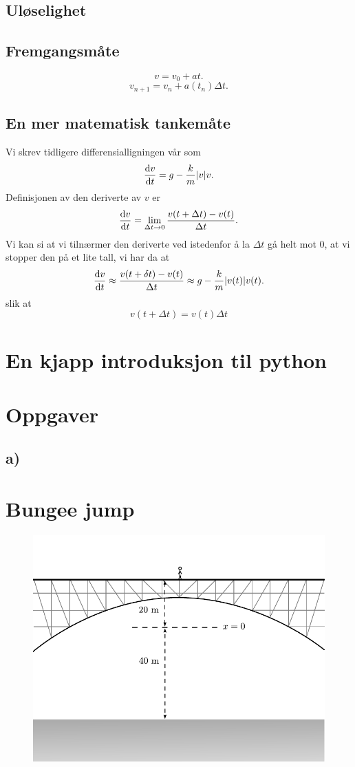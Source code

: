 \documentclass[a4paper, 11pt, notitlepage, english]{article}
\renewcommand{\d}{{\rm d}}
\begin{document}
\subsection{Uløselighet}

\subsection{Fremgangsmåte}
$$v = v_0 + a t.$$
$$v_{n+1} = v_n + a(t_n)\Delta t.$$

\subsection{En mer matematisk tankemåte}
Vi skrev tidligere differensialligningen vår som
$$\frac{\d v}{\d t} = g - \frac{k}{m}|v|v.$$
Definisjonen av den deriverte av $v$ er
$$\frac{\d v}{\d t} = \lim_{\Delta t \to 0} \frac{v(t+\Delta t)-v(t)}{\Delta t}.$$
Vi kan si at vi tilnærmer den deriverte ved istedenfor å la $\Delta t$ gå helt mot 0, at vi stopper den på et lite tall, vi har da at
$$\frac{\d v}{\d t} \approx \frac{v(t+\delta t) - v(t)}{\Delta t} \approx g - \frac{k}{m}|v(t)|v(t).$$
slik at
$$v(t+\Delta t) = v(t)\Delta t $$

\section{En kjapp introduksjon til python}


\clearpage

\section{Oppgaver}
\subsection*{a)}

\clearpage

\section{Bungee jump}

\begin{figure}
\centering
\includegraphics[width=\textwidth]{Bungee_bridge}
\end{figure}
\end{document}
